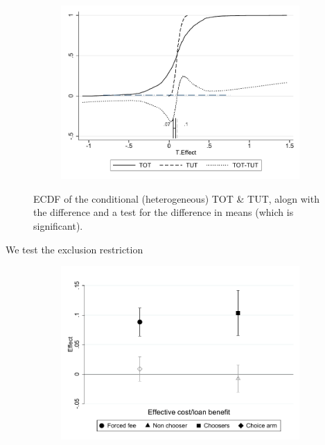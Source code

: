 \documentclass[oneside,11pt]{article}
\begin{document}
\begin{figure}[H]
     \caption{TOT-TUT CDF}
    \begin{center}
    \begin{subfigure}{0.7\textwidth}
        \centering
        \includegraphics[width=\textwidth]{Figuras/cdf_tot_tut.pdf}
    \end{subfigure}
    \end{center}
    \scriptsize
        ECDF of the conditional (heterogeneous) TOT \& TUT, alogn with the difference and a test for the difference in means (which is significant).
\end{figure}


We test the exclusion restriction

\begin{figure}[H]
     \caption{Exclusion restriction}
    \begin{center}
    \begin{subfigure}{0.7\textwidth}
        \centering
        \includegraphics[width=\textwidth]{Figuras/exclusion_restriction.pdf}
    \end{subfigure}
    \end{center}
    \scriptsize
    
\end{figure}


\newpage
\clearpage

%
%


\end{document}
